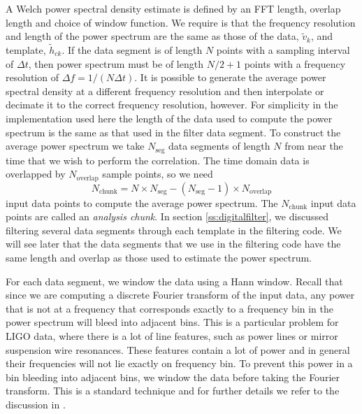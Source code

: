 A Welch power spectral density estimate is defined by an FFT length, overlap
length and choice of window function.  We require is that the frequency
resolution and length of the power spectrum are the same as those of the data,
$\tilde{v}_k$, and template, $\tilde{h}_{ck}$. If the data segment is of length
$N$ points with a sampling interval of $\Delta t$, then power spectrum must be
of length $N/2 + 1$ points with a frequency resolution of $\Delta f =
1/(N\Delta t)$.  It is possible to generate the average power spectral density
at a different frequency resolution and then interpolate or decimate it to the
correct frequency resolution, however. For simplicity in the implementation
used here the  length of the data used to compute the power spectrum is the
same as that used in the filter data segment.  To construct the average power
spectrum we take $N_\mathrm{seg}$ data segments of length $N$ from near the
time that we wish to perform the correlation. The time domain data is
overlapped by $N_\mathrm{overlap}$ sample points, so we need
\begin{equation}
N_\mathrm{chunk} = 
N \times N_\mathrm{seg} - ( N_\mathrm{seg} - 1 ) \times N_\mathrm{overlap}
\end{equation}
input data points to compute the average power spectrum. The
$N_\mathrm{chunk}$ input data points are called an \emph{analysis chunk}.
In section \ref{ss:digitalfilter}, we discussed filtering several data
segments through each template in the filtering code. We will see later that
the data segments that we use in the filtering code have the same length and 
overlap as those used to estimate the power spectrum. 

For each data segment, we window the data using a Hann window. Recall that
since we are computing a discrete Fourier transform of the input data, any
power that is not at a frequency that corresponds exactly to a frequency bin
in the power spectrum will bleed into adjacent bins. This is a particular
problem for LIGO data, where there is a lot of line features, such as power
lines or mirror suspension wire resonances. These features contain a lot of
power and in general their frequencies will not lie exactly on frequency bin. 
To prevent this power in a bin bleeding into adjacent bins, we window the data
before taking the Fourier transform. This is a standard technique and for
further details we refer to the discussion in \cite{Press:1992}. 

